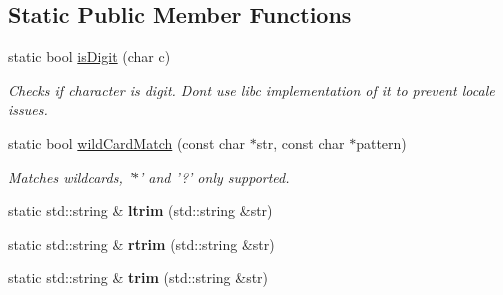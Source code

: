 \subsection*{Static Public Member Functions}
\begin{DoxyCompactItemize}
\item 
\hypertarget{classel_1_1base_1_1utils_1_1Str_a4caae91dfe0310d9f182bd9b7e99103c}{static bool \hyperlink{classel_1_1base_1_1utils_1_1Str_a4caae91dfe0310d9f182bd9b7e99103c}{is\-Digit} (char c)}\label{classel_1_1base_1_1utils_1_1Str_a4caae91dfe0310d9f182bd9b7e99103c}

\begin{DoxyCompactList}\small\item\em Checks if character is digit. Dont use libc implementation of it to prevent locale issues. \end{DoxyCompactList}\item 
\hypertarget{classel_1_1base_1_1utils_1_1Str_a95e007a25dfcbd77d4c573b0f73b3153}{static bool \hyperlink{classel_1_1base_1_1utils_1_1Str_a95e007a25dfcbd77d4c573b0f73b3153}{wild\-Card\-Match} (const char $\ast$str, const char $\ast$pattern)}\label{classel_1_1base_1_1utils_1_1Str_a95e007a25dfcbd77d4c573b0f73b3153}

\begin{DoxyCompactList}\small\item\em Matches wildcards, '$\ast$' and '?' only supported. \end{DoxyCompactList}\item 
\hypertarget{classel_1_1base_1_1utils_1_1Str_a64b7a841f04ed916ed8d234b8508703e}{static std\-::string \& {\bfseries ltrim} (std\-::string \&str)}\label{classel_1_1base_1_1utils_1_1Str_a64b7a841f04ed916ed8d234b8508703e}

\item 
\hypertarget{classel_1_1base_1_1utils_1_1Str_a9202797763e10861c4fa84ffd40198bb}{static std\-::string \& {\bfseries rtrim} (std\-::string \&str)}\label{classel_1_1base_1_1utils_1_1Str_a9202797763e10861c4fa84ffd40198bb}

\item 
\hypertarget{classel_1_1base_1_1utils_1_1Str_aba0bc132c410fd3c1e128d1038e996ba}{static std\-::string \& {\bfseries trim} (std\-::string \&str)}\label{classel_1_1base_1_1utils_1_1Str_aba0bc132c410fd3c1e128d1038e996ba}


\end{DoxyCompactItemize}
